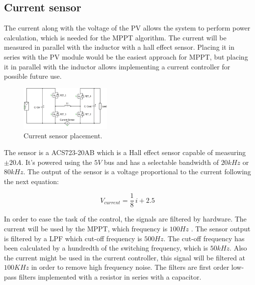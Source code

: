 \subsection{Current sensor} \label{current_sensor}

The current along with the voltage of the PV allows the system to perform power calculation, which is needed for the MPPT algorithm. The current will be measured in parallel with the inductor with a hall effect sensor. Placing it in series with the PV module would be the easiest approach for MPPT, but placing it in parallel with the inductor allows implementing a current controller for possible future use.

\begin{figure}[htbp]
	\begin{center}
		\includegraphics[width=0.4\textwidth]{../Pictures/current_sensor_placement.png}
		\caption{Current sensor placement.}
		\label{current_sensor_placement}
	\end{center}	
\end{figure}

The sensor is a ACS723-20AB which is a Hall effect sensor capable of measuring $\pm 20 A$. It's powered using the $5 V$ bus and has a selectable bandwidth of $20 kHz$ or $80 kHz$. The output of the sensor is a voltage proportional to the current following the next equation:

\begin{equation} 
V_{current} = \frac{1}{8} \, i + 2.5
\end{equation} 

In order to ease the task of the control, the signals are filtered by hardware. The current will be used by the MPPT, which frequency is $100 Hz$ . The sensor output is filtered by a LPF which cut-off frequency is $500 Hz$. The cut-off frequency has been calculated by a hundredth of the switching frequency, which is $50 kHz$. Also the current might be used in the current controller, this signal will be filtered at $100 KHz$ in order to remove high frequency noise. The filters are first order low-pass filters implemented with a resistor in series with a capacitor.

